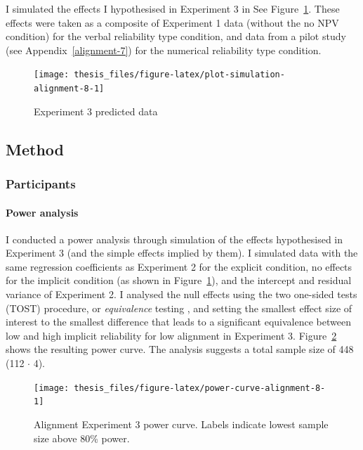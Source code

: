 \documentclass[a4paper, nobind, dvipsnames]{templates/ociamthesis}
\theoremstyle{definition}
\theoremstyle{definition}
\theoremstyle{definition}
\theoremstyle{definition}
\theoremstyle{remark}
\begin{document}
I simulated the effects I hypothesised in Experiment 3 in See
Figure~\ref{fig:plot-simulation-alignment-8}. These effects were taken as a
composite of Experiment 1 data (without the no NPV condition) for the verbal
reliability type condition, and data from a pilot study (see
Appendix~\ref{alignment-7}) for the numerical reliability type condition.



\begin{figure}
\texttt{[image: thesis\_files/figure-latex/plot-simulation-alignment-8-1]} \caption{Experiment 3 predicted data}\label{fig:plot-simulation-alignment-8}
\end{figure}

\subsection{Method}

\subsubsection{Participants}

\hypertarget{power-analysis-alignment-8}{%
\paragraph{Power analysis}\label{power-analysis-alignment-8}}

I conducted a power analysis through simulation of the effects hypothesised in
Experiment 3 (and the simple effects implied by them). I simulated
data with the same regression coefficients as Experiment 2 for the explicit
condition, no effects for the implicit condition (as shown in
Figure~\ref{fig:plot-simulation-alignment-8}), and the intercept and residual
variance of Experiment 2. I analysed the null effects using the two one-sided
tests (TOST) procedure, or \emph{equivalence} testing \autocite{lakens2018}, and setting the
smallest effect size of interest to the smallest difference that leads to a
significant equivalence between low and high implicit reliability for low
alignment in Experiment 3. Figure~\ref{fig:power-curve-alignment-8} shows the
resulting power curve. The analysis suggests a total sample size of
448 (112 \(\cdot\) 4).

\newpage

\begin{landscape}



\begin{figure}
\texttt{[image: thesis\_files/figure-latex/power-curve-alignment-8-1]} \caption{Alignment Experiment 3 power curve. Labels indicate lowest sample size above 80\% power.}\label{fig:power-curve-alignment-8}
\end{figure}

\end{landscape}
\end{document}
